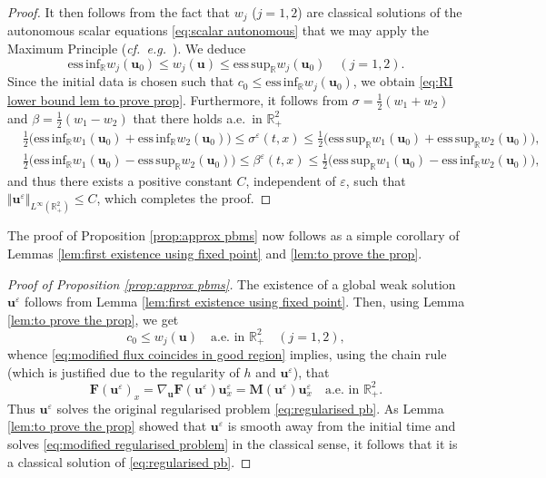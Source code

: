 \documentclass[11pt,a4paper,reqno]{amsart}
\numberwithin{equation}{section}
\theoremstyle{definition}
\theoremstyle{remark}
\newcommand{\bu}{\mathbf{u}}
\newcommand{\bF}{\mathbf{F}}
\newcommand{\esssup}{\mathrm{ess \, sup}}
\newcommand{\essinf}{\mathrm{ess \, inf}}
\newcommand{\bM}{\mathbf{M}}
\renewcommand{\leq}{\leqslant}
\begin{document}
{\begin{proof}
It then follows from the fact that $w_j$ ($j=1,2$) are classical solutions of the autonomous scalar equations \eqref{eq:scalar autonomous} that we may apply the Maximum Principle (\textit{cf.~e.g.}~\cite[\S 2.3]{Serre1}). We deduce 
\begin{equation*}
\essinf_\mathbb{R} w_j(\bu_0) \leq w_j(\bu) \leq \esssup_\mathbb{R} w_j(\bu_0) \quad (j=1,2). 
\end{equation*}
Since the initial data is chosen such that $c_0 \leq \essinf_\mathbb{R} w_j(\bu_0)$, we obtain \eqref{eq:RI lower bound lem to prove prop}. Furthermore, it follows from $\sigma = \frac{1}{2}(w_1+w_2)$ and $\beta = \frac{1}{2}(w_1-w_2)$ that there holds a.e.~in $\mathbb{R}^2_+$ 
\begin{equation*}
   \begin{aligned} 
   &\frac{1}{2}\big(\essinf_\mathbb{R} w_1(\bu_0) + \essinf_\mathbb{R} w_2(\bu_0) \big) \leq \sigma^\varepsilon(t,x) \leq \frac{1}{2}\big(\esssup_\mathbb{R} w_1(\bu_0) + \esssup_\mathbb{R} w_2(\bu_0) \big), \\ 
   &\frac{1}{2}\big(\essinf_\mathbb{R} w_1(\bu_0) - \esssup_\mathbb{R} w_2(\bu_0) \big) \leq \beta^\varepsilon(t,x) \leq \frac{1}{2}\big(\esssup_\mathbb{R} w_1(\bu_0) - \essinf_\mathbb{R} w_2(\bu_0) \big), 
   \end{aligned}
\end{equation*}
and thus there exists a positive constant $C$, independent of $\varepsilon$, such that $\Vert \bu^\varepsilon \Vert_{L^\infty(\mathbb{R}^2_+)} \leq C$, which completes the proof. 
\end{proof}



The proof of Proposition \ref{prop:approx pbms} now follows as a simple corollary of Lemmas \ref{lem:first existence using fixed point} and \ref{lem:to prove the prop}. 


\begin{proof}[Proof of Proposition \ref{prop:approx pbms}]
The existence of a global weak solution $\bu^\varepsilon$ follows from Lemma \ref{lem:first existence using fixed point}. Then, using Lemma \ref{lem:to prove the prop}, we get 
\begin{equation*}
c_0 \leq w_j(\bu) \quad \text{a.e.~in } \mathbb{R}^2_+ \quad (j=1,2), 
\end{equation*}
whence \eqref{eq:modified flux coincides in good region} implies, using the chain rule (which is justified due to the regularity of $h$ and $\bu^\varepsilon$), that
\begin{equation*}
    \bF(\bu^\varepsilon)_x = \nabla_\bu \bF(\bu^\varepsilon) \bu^\varepsilon_x = \bM(\bu^\varepsilon) \bu^\varepsilon_x \quad \text{a.e.~in } \mathbb{R}^2_+. 
\end{equation*}
Thus $\bu^\varepsilon$ solves the original regularised problem \eqref{eq:regularised pb}. As Lemma \ref{lem:to prove the prop} showed that $\bu^\varepsilon$ is smooth away from the initial time and solves \eqref{eq:modified regularised problem} in the classical sense, it follows that it is a classical solution of \eqref{eq:regularised pb}. 
\end{proof}


}
\end{document}
